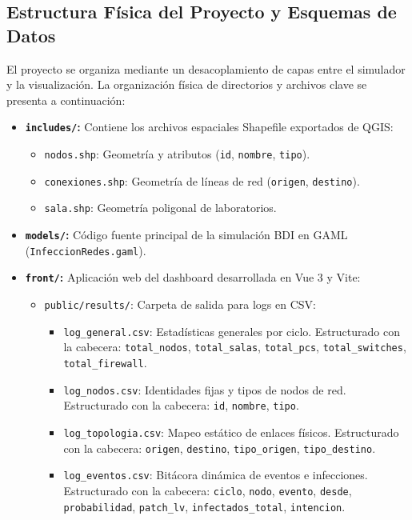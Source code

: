 \subsection{Estructura Física del Proyecto y Esquemas de Datos}
El proyecto se organiza mediante un desacoplamiento de capas entre el simulador y la visualización. La organización física de directorios y archivos clave se presenta a continuación:
\begin{itemize}
    \item \textbf{\texttt{includes/}:} Contiene los archivos espaciales Shapefile exportados de QGIS:
    \begin{itemize}
        \item \texttt{nodos.shp}: Geometría y atributos (\texttt{id}, \texttt{nombre}, \texttt{tipo}).
        \item \texttt{conexiones.shp}: Geometría de líneas de red (\texttt{origen}, \texttt{destino}).
        \item \texttt{sala.shp}: Geometría poligonal de laboratorios.
    \end{itemize}
    \item \textbf{\texttt{models/}:} Código fuente principal de la simulación BDI en GAML (\texttt{Infeccion\allowbreak Redes.\allowbreak gaml}).
    \item \textbf{\texttt{front/}:} Aplicación web del dashboard desarrollada en Vue 3 y Vite:
    \begin{itemize}
        \item \texttt{public/results/}: Carpeta de salida para logs en CSV:
        \begin{itemize}
            \item \texttt{log\_general.csv}: Estadísticas generales por ciclo. Estructurado con la cabecera: \texttt{total\_nodos}, \texttt{total\_salas}, \texttt{total\_pcs}, \texttt{total\_switches}, \texttt{total\_firewall}.
            \item \texttt{log\_nodos.csv}: Identidades fijas y tipos de nodos de red. Estructurado con la cabecera: \texttt{id}, \texttt{nombre}, \texttt{tipo}.
            \item \texttt{log\_topologia.csv}: Mapeo estático de enlaces físicos. Estructurado con la cabecera: \texttt{origen}, \texttt{destino}, \texttt{tipo\_origen}, \texttt{tipo\_destino}.
            \item \texttt{log\_eventos.csv}: Bitácora dinámica de eventos e infecciones. Estructurado con la cabecera: \texttt{ciclo}, \texttt{nodo}, \texttt{evento}, \texttt{desde}, \texttt{probabilidad}, \texttt{patch\_lv}, \texttt{infectados\_total}, \texttt{intencion}.

\end{itemize}
\end{itemize}
\end{itemize}
